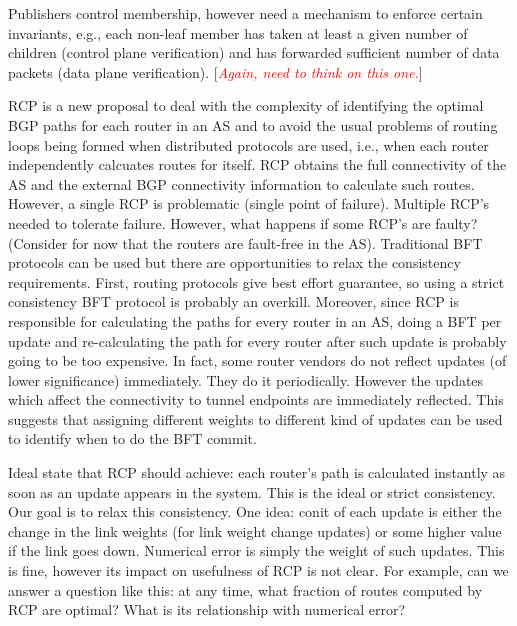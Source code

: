 \documentclass[twocolumn,10pt]{article}
\newcommand{\bihq}{BI-HQ\xspace}
\newcommand{\note}[1]{[\textcolor{red}{\textit{#1}}]}
\newcommand{\stitle}[1]{\vspace{2pt}{\bf #1:}}
\begin{document}
\stitle{CDN} Publishers control membership, however need a mechanism to enforce certain invariants, e.g., 
each non-leaf member has taken at least a given number of children (control plane verification) and 
has forwarded sufficient number of data packets (data plane verification). \note{Again, need to think on this one.}

\stitle{RCP} RCP is a new proposal to deal with the complexity of identifying the optimal BGP paths for each 
router in an AS and to avoid the usual problems of routing loops being formed when distributed protocols are used, i.e., when
each router independently calcuates routes for itself. 
RCP obtains the full connectivity of the AS and the external BGP connectivity information to calculate such routes. However, a single 
RCP is problematic (single point of failure). Multiple RCP's needed to tolerate failure. However, what happens if some RCP's are faulty? 
(Consider for now that the routers are fault-free in the AS). Traditional BFT protocols can be used but there are opportunities to relax
the consistency requirements. First, routing protocols give best effort guarantee, so using a strict consistency BFT protocol
is probably an overkill. Moreover, since RCP is responsible for calculating the paths for every router in an AS, doing a BFT per
update and re-calculating the path for every router after such update is probably going to be too expensive. 
In fact, some router vendors do not reflect updates (of lower significance) immediately. 
They do it periodically. However the updates which affect the connectivity to tunnel endpoints are immediately reflected. 
This suggests that assigning different weights to different kind of updates can be used to identify when to do the BFT commit. 

\stitle{\bihq for RCP} Ideal state that RCP should achieve: each router's path is calculated instantly as soon as 
an update appears in the system. This is the ideal or 
strict consistency. Our goal is to relax this consistency. One idea: conit of each update is either the change in the link
weights (for link weight change updates) or some higher value if the link goes down. Numerical error is simply the weight of
such updates. This is fine, however its impact on usefulness of RCP is not clear. For example, can we answer a question like
this: at any time, what fraction of routes computed by RCP are optimal? What is its relationship with numerical error?
\fi
\end{document}
